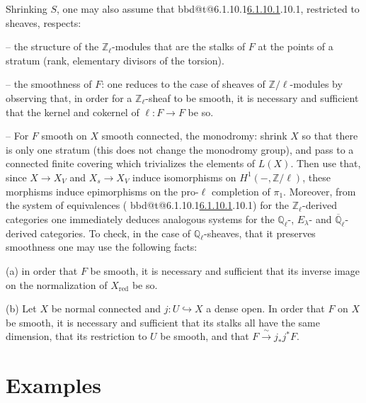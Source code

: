 \documentclass[12pt,oneside]{amsbook}
\makeatletter
\DeclareRobustCommand{\rn}[1]{%
  \ifcsname bbd@t@#1\endcsname\hyperlink{bbd:#1}{#1}\else#1\fi}
\theoremstyle{plain}
\theoremstyle{definition}
\newcommand{\ZZ}{\mathbb{Z}}  \newcommand{\QQ}{\mathbb{Q}}
\newcommand{\Zl}{\mathbb{Z}_{\ell}}
\newcommand{\Ql}{\mathbb{Q}_{\ell}}
\newcommand{\Qlb}{\overline{\mathbb{Q}}_{\ell}}
\newcommand{\isoto}{\xrightarrow{\ \sim\ }}
\newcommand{\hra}{\hookrightarrow}
\makeatother
\begin{document}
\smallskip
Shrinking $S$, one may also assume that \rn{6.1.10.1}, restricted to sheaves, respects:

\smallskip
-- the structure of the $\Zl$-modules that are the stalks of $F$ at the points of a stratum (rank, elementary divisors of the torsion).

-- the smoothness of $F$: one reduces to the case of sheaves of $\ZZ/\ell$-modules by observing that, in order for a $\Zl$-sheaf to be smooth, it is necessary and sufficient that the kernel and cokernel of $\ell : F\to F$ be so.

\smallskip
-- For $F$ smooth on $X$ smooth connected, the monodromy: shrink $X$ so that there is only one stratum (this does not change the monodromy group), and pass to a connected finite covering which trivializes the elements of $L(X)$. Then use that, since $X\to X_{V}$ and $X_{s}\to X_{V}$ induce isomorphisms on $H^{1}(-,\ZZ/\ell)$, these morphisms induce epimorphisms on the pro-$\ell$ completion of $\pi_{1}$. Moreover, from the system of equivalences (\rn{6.1.10.1}) for the $\Zl$-derived categories one immediately deduces analogous systems for the $\Ql$-, $E_{\lambda}$- and $\Qlb$-derived categories. To check, in the case of $\Ql$-sheaves, that it preserves smoothness one may use the following facts:

\smallskip
(a) in order that $F$ be smooth, it is necessary and sufficient that its inverse image on the normalization of $X_{\mathrm{red}}$ be so.

\smallskip
(b) Let $X$ be normal connected and $j : U\hra X$ a dense open. In order that $F$ on $X$ be smooth, it is necessary and sufficient that its stalks all have the same dimension, that its restriction to $U$ be smooth, and that $F\isoto j_{*}j^{*}F$.

\smallskip
\section{Examples}
\end{document}
